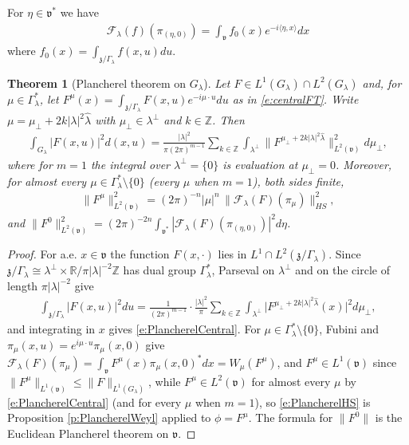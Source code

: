 \documentclass[11pt]{amsart}
\theoremstyle{plain}
\newtheorem{theorem}{Theorem}[section]
\theoremstyle{definition}
\theoremstyle{remark}
\numberwithin{equation}{section}
\def\fz{\mathfrak{z}}
\def\fv{\mathfrak{v}}
\def\cF{\mathcal{F}}
\def\mz{\setminus\{0\}}
\def\R{{\mathbb R}}%
\def\Z{{\mathbb Z}}%
\numberwithin{equation}{section}
\begin{document}
For $\eta\in \fv^*$ we have
\begin{align*}
	\cF_\lambda(f)(\pi_{(\eta, 0)})=\int_{\fv}f_0(x)e^{-i\langle \eta, x\rangle}dx
\end{align*}
where $f_0(x)=\int_{\fz/\Gamma_\lambda}f(x, u)du$.

\begin{theorem}[Plancherel theorem on $G_\lambda$]\label{t:PlancherelQuotient}
	Let $F\in L^1(G_\lambda)\cap L^2(G_\lambda)$ and, for $\mu\in \Gamma_\lambda^*$, let $F^\mu(x)=\int_{\fz/\Gamma_\lambda}F(x, u)e^{-i\mu\cdot u}du$ as in \eqref{e:centralFT}. Write $\mu=\mu_\perp+2k|\lambda|^2\hat\lambda$ with $\mu_\perp\in \lambda^\perp$ and $k\in \Z$. Then
	\begin{align}\label{e:PlancherelCentral}
		\int_{G_\lambda}|F(x, u)|^2d(x, u)=\frac{|\lambda|^2}{\pi(2\pi)^{m-1}}\sum_{k\in \Z}\int_{\lambda^\perp}\big\|F^{\mu_\perp+2k|\lambda|^2\hat\lambda}\big\|^2_{L^2(\fv)}d\mu_\perp,
	\end{align}
	where for $m=1$ the integral over $\lambda^\perp=\{0\}$ is evaluation at $\mu_\perp=0$. Moreover, for almost every $\mu\in \Gamma_\lambda^*\mz$ (every $\mu$ when $m=1$), both sides finite,
	\begin{align}\label{e:PlancherelHS}
		\|F^\mu\|^2_{L^2(\fv)}=(2\pi)^{-n}|\mu|^n\,\|\cF_\lambda(F)(\pi_\mu)\|^2_{HS},
	\end{align}
	and $\|F^0\|^2_{L^2(\fv)}=(2\pi)^{-2n}\int_{\fv^*}|\cF_\lambda(F)(\pi_{(\eta, 0)})|^2d\eta$.
\end{theorem}
\begin{proof}
	For a.e. $x\in \fv$ the function $F(x, \cdot)$ lies in $L^1\cap L^2(\fz/\Gamma_\lambda)$. Since $\fz/\Gamma_\lambda\cong\lambda^\perp\times\R/\pi|\lambda|^{-2}\Z$ has dual group $\Gamma_\lambda^*$, Parseval on $\lambda^\perp$ and on the circle of length $\pi|\lambda|^{-2}$ give
	\begin{align*}
		\int_{\fz/\Gamma_\lambda}|F(x, u)|^2du=\frac{1}{(2\pi)^{m-1}}\cdot\frac{|\lambda|^2}{\pi}\sum_{k\in \Z}\int_{\lambda^\perp}\big|F^{\mu_\perp+2k|\lambda|^2\hat\lambda}(x)\big|^2d\mu_\perp,
	\end{align*}
	and integrating in $x$ gives \eqref{e:PlancherelCentral}. For $\mu\in \Gamma_\lambda^*\mz$, Fubini and $\pi_\mu(x, u)=e^{i\mu\cdot u}\pi_\mu(x, 0)$ give $\cF_\lambda(F)(\pi_\mu)=\int_\fv F^\mu(x)\pi_\mu(x, 0)^*dx=W_\mu(F^\mu)$, and $F^\mu\in L^1(\fv)$ since $\|F^\mu\|_{L^1(\fv)}\leq\|F\|_{L^1(G_\lambda)}$, while $F^\mu\in L^2(\fv)$ for almost every $\mu$ by \eqref{e:PlancherelCentral} (and for every $\mu$ when $m=1$), so \eqref{e:PlancherelHS} is Proposition \ref{p:PlancherelWeyl} applied to $\phi=F^\mu$. The formula for $\|F^0\|$ is the Euclidean Plancherel theorem on $\fv$.
\end{proof}
\end{document}
